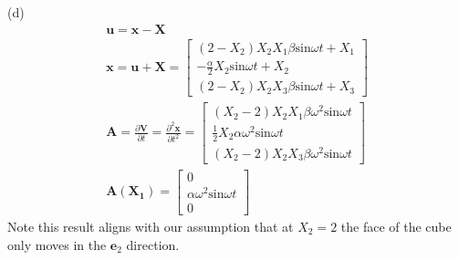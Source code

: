 \medskip
(d) 
\begin{gather*}
    \bm{u}=\bm{x}-\bm{X}\\
    \bm{x}=\bm{u}+\bm{X}=\begin{bmatrix}
        (2-X_2)X_2X_1\beta\text{sin}\omega t+X_1\\-\frac{\alpha}{2}X_2\text{sin}\omega t+ X_2\\(2-X_2)X_2X_3\beta\text{sin}\omega t+X_3
    \end{bmatrix}\\
    \bm{A}=\frac{\partial \bm{V}}{\partial t}=\frac{\partial^2 \bm{x}}{\partial t^2}=\begin{bmatrix}
        (X_2-2)X_2X_1\beta\omega^2\text{sin}\omega t\\ \frac{1}{2}X_2\alpha\omega^2\text{sin}\omega t\\ (X_2-2)X_2X_3\beta\omega^2\text{sin}\omega t
    \end{bmatrix}\\
    \bm{A}(\bm{X_1})=\begin{bmatrix}
        0\\ \alpha\omega^2\text{sin}\omega t\\ 0
    \end{bmatrix}
\end{gather*}
Note this result aligns with our assumption that at $X_2=2$ the face of the cube only moves in the $\bm{e}_2$ direction.
